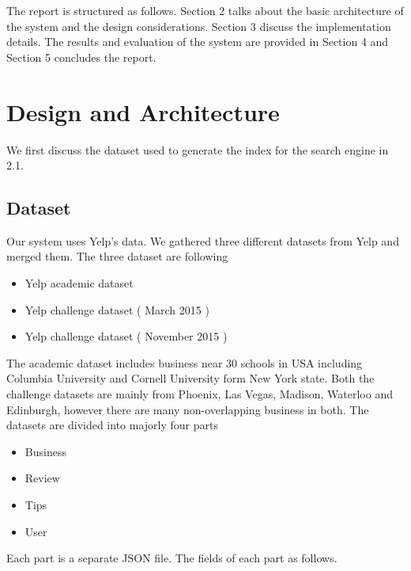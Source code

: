 \documentclass[paper=letter, fontsize=15pt]{article} %
\begin{document}
The report is structured as follows. Section 2 talks about the basic architecture of the system and the design considerations. Section 3 discuss the implementation details. The results and evaluation of the system are provided in Section 4 and Section 5 concludes the report.


\section{Design and Architecture}
We first discuss the dataset used to generate the index for the search engine in 2.1.

\subsection{Dataset}

Our system uses Yelp's data. We gathered three different datasets from Yelp and merged them. The three dataset are following
\begin{itemize}
\item Yelp academic dataset
\item Yelp challenge dataset ( March 2015 )
\item Yelp challenge dataset ( November 2015 )
\end{itemize}
The academic dataset includes business near 30 schools in USA including Columbia University and Cornell University form New York state.
Both the challenge datasets are mainly from Phoenix, Las Vegas, Madison, Waterloo and Edinburgh, however there are many non-overlapping business in both.
The datasets are divided into majorly four parts
\begin{itemize}
\item Business
\item Review
\item Tips
\item User
\end{itemize}
Each part is a separate JSON file. The fields of each part as follows.

\begin{table}
\begin{tabular}{}

\end{tabular}


\end{table}
\end{document}
